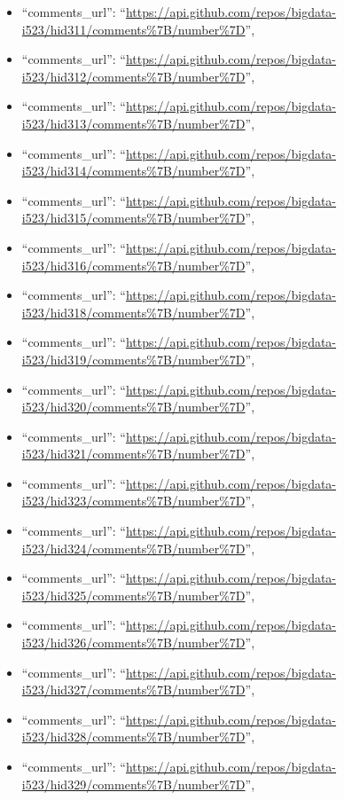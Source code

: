 \begin{itemize}
\item
  ``comments\_url'':
  ``\url{https://api.github.com/repos/bigdata-i523/hid311/comments\%7B/number\%7D}'',
\item
  ``comments\_url'':
  ``\url{https://api.github.com/repos/bigdata-i523/hid312/comments\%7B/number\%7D}'',
\item
  ``comments\_url'':
  ``\url{https://api.github.com/repos/bigdata-i523/hid313/comments\%7B/number\%7D}'',
\item
  ``comments\_url'':
  ``\url{https://api.github.com/repos/bigdata-i523/hid314/comments\%7B/number\%7D}'',
\item
  ``comments\_url'':
  ``\url{https://api.github.com/repos/bigdata-i523/hid315/comments\%7B/number\%7D}'',
\item
  ``comments\_url'':
  ``\url{https://api.github.com/repos/bigdata-i523/hid316/comments\%7B/number\%7D}'',
\item
  ``comments\_url'':
  ``\url{https://api.github.com/repos/bigdata-i523/hid318/comments\%7B/number\%7D}'',
\item
  ``comments\_url'':
  ``\url{https://api.github.com/repos/bigdata-i523/hid319/comments\%7B/number\%7D}'',
\item
  ``comments\_url'':
  ``\url{https://api.github.com/repos/bigdata-i523/hid320/comments\%7B/number\%7D}'',
\item
  ``comments\_url'':
  ``\url{https://api.github.com/repos/bigdata-i523/hid321/comments\%7B/number\%7D}'',
\item
  ``comments\_url'':
  ``\url{https://api.github.com/repos/bigdata-i523/hid323/comments\%7B/number\%7D}'',
\item
  ``comments\_url'':
  ``\url{https://api.github.com/repos/bigdata-i523/hid324/comments\%7B/number\%7D}'',
\item
  ``comments\_url'':
  ``\url{https://api.github.com/repos/bigdata-i523/hid325/comments\%7B/number\%7D}'',
\item
  ``comments\_url'':
  ``\url{https://api.github.com/repos/bigdata-i523/hid326/comments\%7B/number\%7D}'',
\item
  ``comments\_url'':
  ``\url{https://api.github.com/repos/bigdata-i523/hid327/comments\%7B/number\%7D}'',
\item
  ``comments\_url'':
  ``\url{https://api.github.com/repos/bigdata-i523/hid328/comments\%7B/number\%7D}'',
\item
  ``comments\_url'':
  ``\url{https://api.github.com/repos/bigdata-i523/hid329/comments\%7B/number\%7D}'',

\end{itemize}
